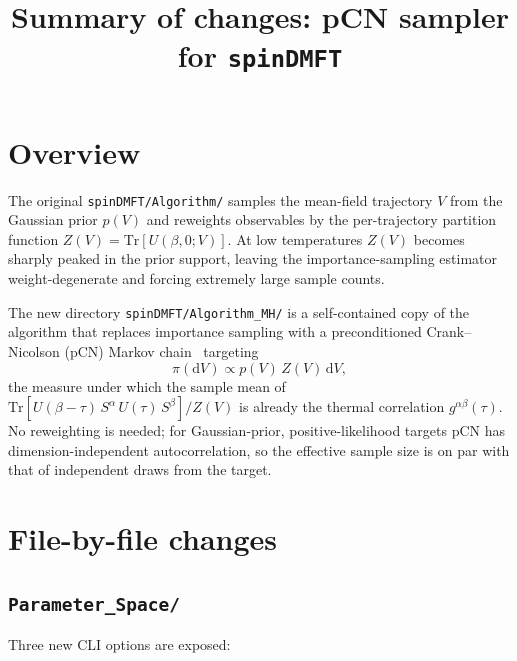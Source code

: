\documentclass[11pt]{article}
\title{Summary of changes: pCN sampler for \texttt{spinDMFT}}
\date{}
\newcommand{\file}[1]{\texttt{#1}}
\newcommand{\dd}{\mathrm{d}}
\newcommand{\Tr}{\mathrm{Tr}}
\begin{document}
\maketitle

\section{Overview}

The original \file{spinDMFT/Algorithm/} samples the mean-field trajectory $V$ from
the Gaussian prior $p(V)$ and reweights observables by the per-trajectory
partition function $Z(V) = \Tr[U(\beta,0;V)]$.  At low temperatures $Z(V)$ becomes
sharply peaked in the prior support, leaving the importance-sampling estimator
weight-degenerate and forcing extremely large sample counts.

The new directory \file{spinDMFT/Algorithm\_MH/} is a self-contained copy of the
algorithm that replaces importance sampling with a preconditioned Crank--Nicolson
(pCN) Markov chain~\cite{Cotter2013} targeting
\begin{equation}
    \pi(\dd V) \propto p(V)\,Z(V)\,\dd V,
\end{equation}
the measure under which the sample mean of $\Tr[U(\beta{-}\tau)\,S^\alpha\,U(\tau)\,S^\beta]/Z(V)$
is already the thermal correlation $g^{\alpha\beta}(\tau)$.  No reweighting is
needed; for Gaussian-prior, positive-likelihood targets pCN has dimension-independent
autocorrelation, so the effective sample size is on par with that of independent
draws from the target.

\section{File-by-file changes}

\subsection{\file{Parameter\_Space/}}

Three new CLI options are exposed:
\end{document}
